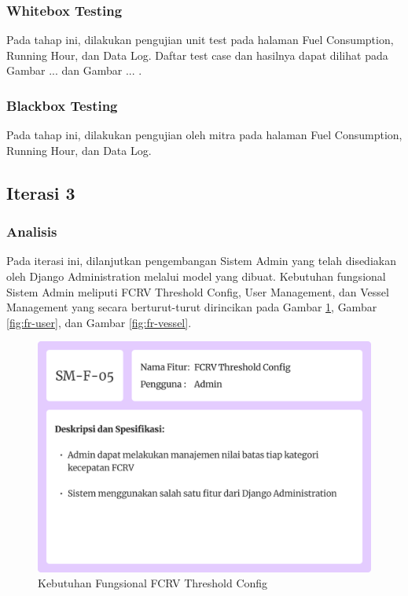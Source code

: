 \newpage

\subsubsection{Whitebox Testing}

Pada tahap ini, dilakukan pengujian unit test pada halaman Fuel Consumption, Running Hour, dan Data Log. Daftar test case dan hasilnya dapat dilihat pada Gambar ... dan Gambar ... .

\begin{landscape}
    \subsubsection{Blackbox Testing}
    Pada tahap ini, dilakukan pengujian oleh mitra pada halaman Fuel Consumption, Running Hour, dan Data Log.

    
    
    \newpage
    

\end{landscape}

\subsection{Iterasi 3}

\subsubsection{Analisis}

Pada iterasi ini, dilanjutkan pengembangan Sistem Admin yang telah disediakan oleh Django Administration melalui model yang dibuat. Kebutuhan fungsional Sistem Admin meliputi FCRV Threshold Config, User Management, dan Vessel Management yang secara berturut-turut dirincikan pada Gambar \ref{fig:fr-fcrv}, Gambar \ref{fig:fr-user}, dan Gambar \ref{fig:fr-vessel}.

\begin{figure}[!h]
    \includegraphics[width=.8\linewidth, center]{images/hasil/iterations/3/fr-fcrv.png}
    \caption{Kebutuhan Fungsional FCRV Threshold Config}
    \label{fig:fr-fcrv}
\end{figure}

